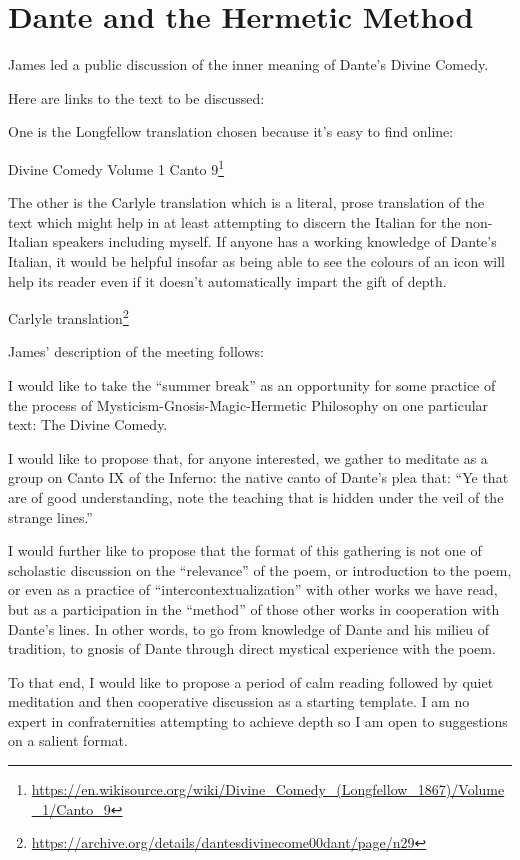 \section{Dante and the Hermetic Method}

James led a public discussion of the inner meaning of Dante's Divine Comedy.

Here are links to the text to be discussed:

One is the Longfellow translation chosen because it's easy to find online:

Divine Comedy Volume 1 Canto 9\footnote{\url{https://en.wikisource.org/wiki/Divine\_Comedy\_(Longfellow\_1867)/Volume\_1/Canto\_9}}

The other is the Carlyle translation which is a literal, prose translation of the text which might help in at least attempting to discern the Italian for the non-Italian speakers including myself. If anyone has a working knowledge of Dante's Italian, it would be helpful insofar as being able to see the colours of an icon will help its reader even if it doesn't automatically impart the gift of depth.

Carlyle translation\footnote{\url{https://archive.org/details/dantesdivinecome00dant/page/n29}}

James' description of the meeting follows:

I would like to take the ``summer break'' as an opportunity for some practice of the process of Mysticism-Gnosis-Magic-Hermetic Philosophy on one particular text: The Divine Comedy.

I would like to propose that, for anyone interested, we gather to meditate as a group on Canto IX of the Inferno: the native canto of Dante's plea that: ``Ye that are of good understanding, note the teaching that is hidden under the veil of the strange lines.''

I would further like to propose that the format of this gathering is not one of scholastic discussion on the ``relevance'' of the poem, or introduction to the poem, or even as a practice of ``intercontextualization'' with other works we have read, but as a participation in the ``method'' of those other works in cooperation with Dante's lines. In other words, to go from knowledge of Dante and his milieu of tradition, to gnosis of Dante through direct mystical experience with the poem.

To that end, I would like to propose a period of calm reading followed by quiet meditation and then cooperative discussion as a starting template. I am no expert in confraternities attempting to achieve depth so I am open to suggestions on a salient format.

